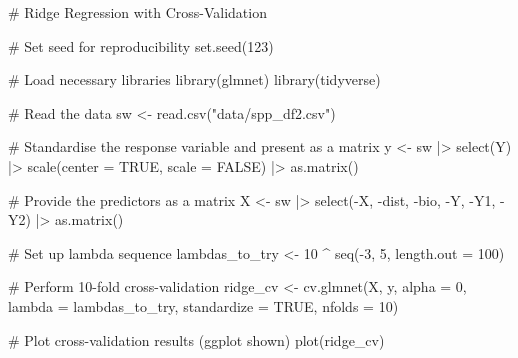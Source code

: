 \documentclass[
  letterpaper,
]{book}
\newenvironment{Shaded}{\begin{snugshade}}{\end{snugshade}}
\newcommand{\AttributeTok}[1]{\textcolor[rgb]{0.40,0.45,0.13}{#1}}
\newcommand{\CommentTok}[1]{\textcolor[rgb]{0.37,0.37,0.37}{#1}}
\newcommand{\ConstantTok}[1]{\textcolor[rgb]{0.56,0.35,0.01}{#1}}
\newcommand{\DecValTok}[1]{\textcolor[rgb]{0.68,0.00,0.00}{#1}}
\newcommand{\FunctionTok}[1]{\textcolor[rgb]{0.28,0.35,0.67}{#1}}
\newcommand{\NormalTok}[1]{\textcolor[rgb]{0.00,0.23,0.31}{#1}}
\newcommand{\OtherTok}[1]{\textcolor[rgb]{0.00,0.23,0.31}{#1}}
\newcommand{\SpecialCharTok}[1]{\textcolor[rgb]{0.37,0.37,0.37}{#1}}
\newcommand{\StringTok}[1]{\textcolor[rgb]{0.13,0.47,0.30}{#1}}
\begin{document}
\begin{Shaded}
\begin{Highlighting}[]
\CommentTok{\# Ridge Regression with Cross{-}Validation}

\CommentTok{\# Set seed for reproducibility}
\FunctionTok{set.seed}\NormalTok{(}\DecValTok{123}\NormalTok{)}

\CommentTok{\# Load necessary libraries}
\FunctionTok{library}\NormalTok{(glmnet)}
\FunctionTok{library}\NormalTok{(tidyverse)}

\CommentTok{\# Read the data}
\NormalTok{sw }\OtherTok{\textless{}{-}} \FunctionTok{read.csv}\NormalTok{(}\StringTok{"data/spp\_df2.csv"}\NormalTok{)}

\CommentTok{\# Standardise the response variable and present as a matrix}
\NormalTok{y }\OtherTok{\textless{}{-}}\NormalTok{ sw }\SpecialCharTok{|\textgreater{}}
  \FunctionTok{select}\NormalTok{(Y) }\SpecialCharTok{|\textgreater{}}
  \FunctionTok{scale}\NormalTok{(}\AttributeTok{center =} \ConstantTok{TRUE}\NormalTok{, }\AttributeTok{scale =} \ConstantTok{FALSE}\NormalTok{) }\SpecialCharTok{|\textgreater{}}
  \FunctionTok{as.matrix}\NormalTok{()}

\CommentTok{\# Provide the predictors as a matrix}
\NormalTok{X }\OtherTok{\textless{}{-}}\NormalTok{ sw }\SpecialCharTok{|\textgreater{}}
  \FunctionTok{select}\NormalTok{(}\SpecialCharTok{{-}}\NormalTok{X, }\SpecialCharTok{{-}}\NormalTok{dist, }\SpecialCharTok{{-}}\NormalTok{bio, }\SpecialCharTok{{-}}\NormalTok{Y, }\SpecialCharTok{{-}}\NormalTok{Y1, }\SpecialCharTok{{-}}\NormalTok{Y2) }\SpecialCharTok{|\textgreater{}}
  \FunctionTok{as.matrix}\NormalTok{()}

\CommentTok{\# Set up lambda sequence}
\NormalTok{lambdas\_to\_try }\OtherTok{\textless{}{-}} \DecValTok{10} \SpecialCharTok{\^{}} \FunctionTok{seq}\NormalTok{(}\SpecialCharTok{{-}}\DecValTok{3}\NormalTok{, }\DecValTok{5}\NormalTok{, }\AttributeTok{length.out =} \DecValTok{100}\NormalTok{)}

\CommentTok{\# Perform 10{-}fold cross{-}validation}
\NormalTok{ridge\_cv }\OtherTok{\textless{}{-}} \FunctionTok{cv.glmnet}\NormalTok{(X, y, }\AttributeTok{alpha =} \DecValTok{0}\NormalTok{, }\AttributeTok{lambda =}\NormalTok{ lambdas\_to\_try,}
  \AttributeTok{standardize =} \ConstantTok{TRUE}\NormalTok{, }\AttributeTok{nfolds =} \DecValTok{10}\NormalTok{)}
\end{Highlighting}
\end{Shaded}

\begin{Shaded}
\begin{Highlighting}[]
\CommentTok{\# Plot cross{-}validation results (ggplot shown)}
\FunctionTok{plot}\NormalTok{(ridge\_cv)}
\end{Highlighting}
\end{Shaded}
\end{document}
